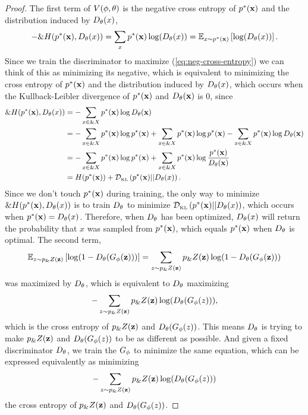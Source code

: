 \begin{proof}
  The first term of $V(\phi, \theta)$ is the negative cross entropy of $p^*(\mathbf{x})$ and
  the distribution induced by $D_\theta(x)$,
\begin{align}
  \label{eq:neg-cross-entropy}
  - \&H(p^*(\mathbf{x}), D_\theta(x)) = \sum_{x}p^*(\mathbf{x})\log(D_\theta(x)) = \mathbb{E}_{x \sim p^*(\mathbf{x})} \left[\log(D_\theta(x))\right].
\end{align}
Since we train the discriminator to maximize
(\ref{eq:neg-cross-entropy}) we can think of this as minimizing its
negative, which is equivalent to minimizing the cross entropy of $p^*(\mathbf{x})$
and the distribution induced by $D_\theta(x)$, which occurs when the
Kullback-Leibler divergence of $p^*(\mathbf{x})$ and $D_\theta(\mathbf{x})$ is 0, since
\begin{align}
  \&H(p^*(\mathbf{x}),D_\theta(x)) & = - \sum_{x \in \&X} p^*(\mathbf{x}) \log D_\theta(\mathbf{x}) \\
                   & = -\sum_{x \in \&X} p^*(\mathbf{x}) \log p^*(\mathbf{x}) + \sum_{x \in \&X} p^*(\mathbf{x}) \log p^*(\mathbf{x}) - \sum_{x \in \&X} p^*(\mathbf{x}) \log D_\theta(\mathbf{x}) \\
                   & = -\sum_{x \in \&X} p^*(\mathbf{x}) \log p^*(\mathbf{x}) + \sum_{x \in \&X} p^*(\mathbf{x}) \log {p^*(\mathbf{x})\over
                     D_\theta(\mathbf{x})}  \\
                   & = H(p^*(\mathbf{x})) + \mathcal{D}_{\text{\tiny KL}}\left( p^*(\mathbf{x}) \middle| \middle| D_\theta(x) \right).
\end{align}
Since we don't touch $p^*(\mathbf{x})$ during training, the only way to minimize
$\&H(p^*(\mathbf{x}),D_\theta(x))$ is to train $D_\theta$ to minimize $\mathcal{D}_{\text{\tiny KL}}\left( p^*(\mathbf{x}) \middle| \middle| D_\theta(x) \right)$,
which occurs when $p^*(\mathbf{x}) = D_\theta(x)$. Therefore, when $D_\theta$ has been
optimized, $D_\theta(x)$ will return the probability that $x$ was
sampled from $p^*(\mathbf{x})$, which equals $p^*(\mathbf{x})$ when $D_\theta$ is optimal. The
second term,
\begin{align}
  \mathbb{E}_{z \sim p_\&Z(\mathbf{z})}\left[\log(1 - D_\theta(G_\phi(\mathbf{z})))\right] =
  \sum_{z \sim p_\&Z(\mathbf{z})} p_\&Z(\mathbf{z}) \log (1 - D_\theta(G_\phi(\mathbf{z})))
\end{align}
was maximized by $D_\theta$, which is equivalent to $D_\theta$ maximizing
\begin{align}
  -\sum_{z \sim p_\&Z(\mathbf{z})} p_\&Z(\mathbf{z}) \log (D_\theta(G_\phi(z))),
\end{align}
which is the cross entropy of $p_\&Z(\mathbf{z})$ and $D_\theta(G_\phi(z))$. This means $D_\theta$ is trying
to make $p_\&Z(\mathbf{z})$ and $D_\theta(G_\phi(z))$ to be as different as possible. And given a
fixed discriminator $D_\theta$, we train the $G_\phi$ to minimize the same equation, which
can be expressed equivalently as minimizing
\begin{align}
  -\sum_{z \sim p_\&Z(\mathbf{z})} p_\&Z(\mathbf{z}) \log (D_\theta(G_\phi(z)))
\end{align}
the cross entropy of $p_\&Z(\mathbf{z})$ and $D_\theta(G_\phi(z))$.
\end{proof}

